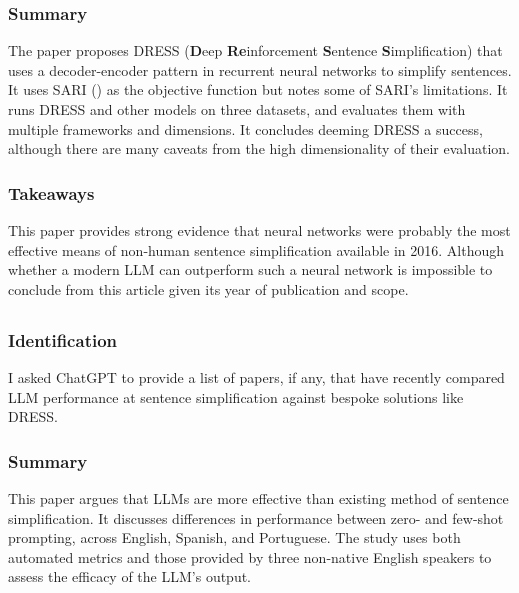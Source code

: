 \documentclass[
	letterpaper, %
]{jdf}
\begin{document}
\subsubsection{Summary}
The paper proposes DRESS (\textbf{D}eep \textbf{Re}inforcement \textbf{S}entence \textbf{S}implification) that uses a decoder-encoder pattern in recurrent neural networks to simplify sentences. It uses SARI (\cite{xu-etal-2016-optimizing}) as the objective function but notes some of SARI's limitations. It runs DRESS and other models on three datasets, and evaluates them with multiple frameworks and dimensions. It concludes deeming DRESS a success, although there are many caveats from the high dimensionality of their evaluation.

\subsubsection{Takeaways}
This paper provides strong evidence that neural networks were probably the most effective means of non-human sentence simplification available in 2016. Although whether a modern LLM can outperform such a neural network is impossible to conclude from this article given its year of publication and scope.

\subsection{}
\subsubsection{Identification}
I asked ChatGPT to provide a list of papers, if any, that have recently compared LLM performance at sentence simplification against bespoke solutions like DRESS. 

\subsubsection{Summary}
This paper argues that LLMs are more effective than existing method of sentence simplification. It discusses differences in performance between zero- and few-shot prompting, across English, Spanish, and Portuguese. The study uses both automated metrics and those provided by three non-native English speakers to assess the efficacy of the LLM's output.
\end{document}
